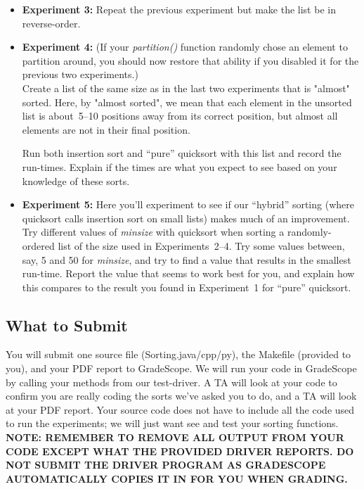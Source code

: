 \documentclass[11pt]{article}
\begin{document}
\begin{itemize}
\item {\bf Experiment 3:} Repeat the previous experiment but make the list be in reverse-order.

\item {\bf Experiment 4:} (If your {\em partition()\/} function randomly chose an element to partition around, you should now restore that ability if you disabled it for the previous two experiments.) \\
Create a list of the same size as in the last two experiments that is "almost" sorted. Here, by "almost
sorted", we mean that each element in the unsorted list is about~5--10 positions away
from its correct position, but almost all elements are not in their final position.

Run both insertion sort and ``pure'' quicksort with this list and record the run-times. Explain if the times are what you expect to see based on your knowledge of these sorts.

\item {\bf Experiment 5:} Here you'll experiment to see if our ``hybrid'' sorting (where  quicksort calls insertion sort on small lists) makes much of an improvement.  Try different values of {\em minsize}  with quicksort when sorting  a randomly-ordered list of the size used in Experiments~2--4.   Try some values between, say, 5 and 50 for  {\em minsize}, and try to find a value that results in the smallest run-time.  Report the value that seems to work best for you, and explain how this compares to the result you found in Experiment~1 for ``pure'' quicksort.

\end{itemize}

\subsection*{What to Submit}

You will submit one source file (Sorting.java/cpp/py), the Makefile (provided to you), and your PDF report to GradeScope. We will run your code in GradeScope by calling your methods from our test-driver.  A TA will look at your code to confirm you are really coding the sorts we've asked you to do, and a TA will look at your PDF report.  Your source code does not have to include all the code used to run the experiments; we will just want see and test your sorting functions. \textbf{NOTE: REMEMBER TO REMOVE ALL OUTPUT FROM YOUR CODE EXCEPT WHAT THE PROVIDED DRIVER REPORTS. DO NOT SUBMIT THE DRIVER PROGRAM AS GRADESCOPE AUTOMATICALLY COPIES IT IN FOR YOU WHEN GRADING.}
\end{document}
